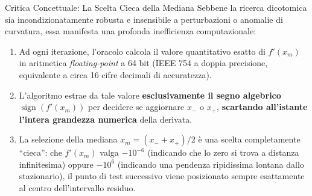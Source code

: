 \begin{alertblock}{Critica Concettuale: La Scelta Cieca della Mediana}
Sebbene la ricerca dicotomica sia incondizionatamente robusta e insensibile a perturbazioni o anomalie di curvatura, essa manifesta una profonda inefficienza computazionale:
\begin{enumerate}
    \item Ad ogni iterazione, l'oracolo calcola il valore quantitativo esatto di $f'(x_m)$ in aritmetica \textit{floating-point} a 64 bit (IEEE 754 a doppia precisione, equivalente a circa 16 cifre decimali di accuratezza).
    \item L'algoritmo estrae da tale valore \textbf{esclusivamente il segno algebrico} $\operatorname{sign}(f'(x_m))$ per decidere se aggiornare $x_-$ o $x_+$, \textbf{scartando all'istante l'intera grandezza numerica} della derivata.
    \item La selezione della mediana $x_m = (x_- + x_+)/2$ \`e una scelta completamente ``cieca'': che $f'(x_m)$ valga $-10^{-6}$ (indicando che lo zero si trova a distanza infinitesima) oppure $-10^6$ (indicando una pendenza ripidissima lontana dallo stazionario), il punto di test successivo viene posizionato sempre esattamente al centro dell'intervallo residuo.
\end{enumerate}
\end{alertblock}

